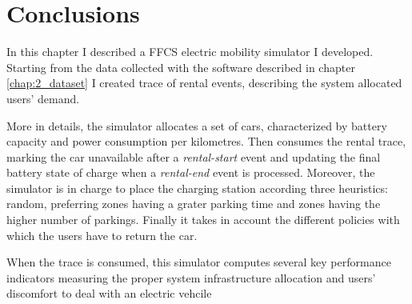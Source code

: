 \section{Conclusions}\label{key}
\label{sec:5_6_conclusion}
In this chapter I described a FFCS electric mobility simulator I developed. Starting from the data collected with the software described in chapter \ref{chap:2_dataset} I created trace of rental events, describing the system allocated users' demand. 

More in details, the simulator allocates a set of cars, characterized by battery capacity and power consumption per kilometres. Then consumes the rental trace, marking the car unavailable after a \textit{rental-start} event and updating the final battery state of charge when a \textit{rental-end} event is processed. Moreover, the simulator is in charge to place the charging station according three heuristics: random, preferring zones having a grater parking time and zones having the higher number of parkings. Finally it takes in account the different policies with which the users have to return the car.

When the trace is consumed, this simulator computes several key performance indicators measuring the proper system infrastructure allocation and users' discomfort to deal with an electric vehcile